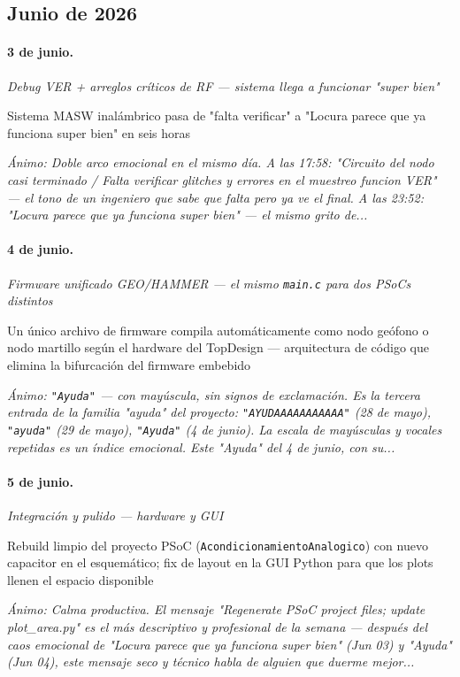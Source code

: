 \subsection{Junio de 2026}
\paragraph{3 de junio.}
\emph{Debug VER + arreglos críticos de RF --- sistema llega a funcionar "super bien"}

Sistema MASW inalámbrico pasa de "falta verificar" a "Locura parece que ya funciona super bien" en seis horas

{\footnotesize\itshape \'Animo: Doble arco emocional en el mismo día. A las 17:58: "Circuito del nodo casi terminado / Falta verificar glitches y errores en el muestreo funcion VER" --- el tono de un ingeniero que sabe que falta pero ya ve el final. A las 23:52: "Locura parece que ya funciona super bien" --- el mismo grito de...}

\paragraph{4 de junio.}
\emph{Firmware unificado GEO/HAMMER --- el mismo \texttt{main.c} para dos PSoCs distintos}

Un único archivo de firmware compila automáticamente como nodo geófono o nodo martillo según el hardware del TopDesign --- arquitectura de código que elimina la bifurcación del firmware embebido

{\footnotesize\itshape \'Animo: \texttt{"Ayuda"} --- con mayúscula, sin signos de exclamación. Es la tercera entrada de la familia "ayuda" del proyecto: \texttt{"AYUDAAAAAAAAAAA"} (28 de mayo), \texttt{"ayuda"} (29 de mayo), \texttt{"Ayuda"} (4 de junio). La escala de mayúsculas y vocales repetidas es un índice emocional. Este "Ayuda" del 4 de junio, con su...}

\paragraph{5 de junio.}
\emph{Integración y pulido --- hardware y GUI}

Rebuild limpio del proyecto PSoC (\texttt{AcondicionamientoAnalogico}) con nuevo capacitor en el esquemático; fix de layout en la GUI Python para que los plots llenen el espacio disponible

{\footnotesize\itshape \'Animo: Calma productiva. El mensaje "Regenerate PSoC project files; update plot\_area.py" es el más descriptivo y profesional de la semana --- después del caos emocional de "Locura parece que ya funciona super bien" (Jun 03) y "Ayuda" (Jun 04), este mensaje seco y técnico habla de alguien que duerme mejor...}

